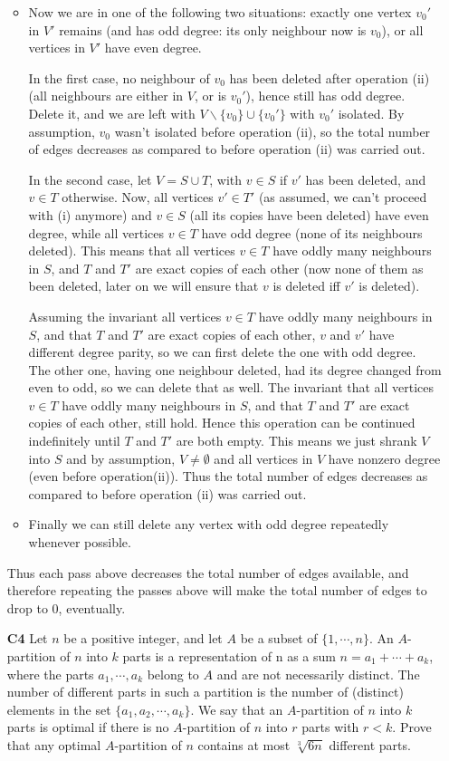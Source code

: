 \documentclass[11pt,a4paper]{article}
\begin{document}
\begin{enumerate}
\begin{itemize}
		\item Now we are in one of the following two situations: exactly one vertex $v_0'$ in $V'$ remains (and has odd degree: its only neighbour now is $v_0$), or all vertices in $V'$ have even degree. 
		
		In the first case, no neighbour of $v_0$ has been deleted after operation (ii) (all neighbours are either in $V$, or is $v_0'$), hence still has odd degree. Delete it, and we are left with $V\backslash \{v_0\}\cup \{v_0'\}$ with $v_0'$ isolated. By assumption, $v_0$ wasn't isolated before operation (ii), so the total number of edges decreases as compared to before operation (ii) was carried out. 
		
		In the second case, let $V=S\cup T$, with $v\in S$ if $v'$ has been deleted, and $v\in T$ otherwise. Now, all vertices $v'\in T'$ (as assumed, we can't proceed with (i) anymore) and $v\in S$ (all its copies have been deleted) have even degree, while all vertices $v\in T$ have odd degree (none of its neighbours deleted). This means that all vertices $v\in T$ have oddly many neighbours in $S$, and $T$ and $T'$ are exact copies of each other (now none of them as been deleted, later on we will ensure that $v$ is deleted iff $v'$ is deleted). 
		
		Assuming the invariant all vertices $v\in T$ have oddly many neighbours in $S$, and that $T$ and $T'$ are exact copies of each other, $v$ and $v'$ have different degree parity, so we can first delete the one with odd degree. The other one, having one neighbour deleted, had its degree changed from even to odd, so we can delete that as well. The invariant that all vertices $v\in T$ have oddly many neighbours in $S$, and that $T$ and $T'$ are exact copies of each other, still hold. Hence this operation can be continued indefinitely until $T$ and $T'$ are both empty. This means we just shrank $V$ into $S$ and by assumption, $V\neq\emptyset$ and all vertices in $V$ have nonzero degree (even before operation(ii)). Thus the total number of edges decreases as compared to before operation (ii) was carried out. 
		
		\item Finally we can still delete any vertex with odd degree repeatedly whenever possible. 
	\end{itemize}
	Thus each pass above decreases the total number of edges available, and therefore repeating the passes above will make the total number of edges to drop to 0, eventually. 
	
	\item [\textbf{C4}] Let $n$ be a positive integer, and let $A$ be a subset of $\{ 1,\cdots ,n\}$. An $A$-partition of $n$ into $k$ parts is a representation of n as a sum $n = a_1 + \cdots + a_k$, where the parts $a_1 , \cdots , a_k $ belong to $A$ and are not necessarily distinct. The number of different parts in such a partition is the number of (distinct) elements in the set $\{ a_1 , a_2 , \cdots , a_k \} $.
	We say that an $A$-partition of $n$ into $k$ parts is optimal if there is no $A$-partition of $n$ into $r$ parts with $r<k$. Prove that any optimal $A$-partition of $n$ contains at most $\sqrt[3]{6n}$ different parts.
	

\end{enumerate}
\end{document}
